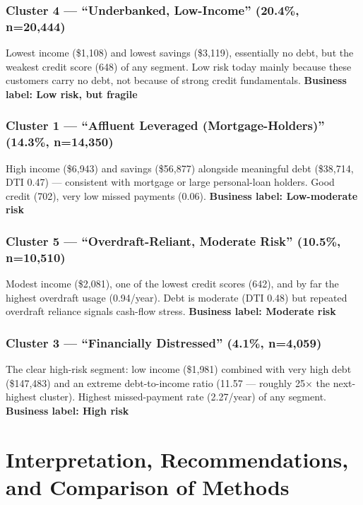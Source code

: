\documentclass[11pt]{article}
\begin{document}
\subsubsection*{Cluster 4 --- ``Underbanked, Low-Income'' (20.4\%, n=20,444)}
Lowest income (\$1{,}108) and lowest savings (\$3{,}119), essentially no debt, but the weakest credit score (648) of any segment. Low risk today mainly because these customers carry no debt, not because of strong credit fundamentals. \textbf{Business label: Low risk, but fragile}

\subsubsection*{Cluster 1 --- ``Affluent Leveraged (Mortgage-Holders)'' (14.3\%, n=14,350)}
High income (\$6{,}943) and savings (\$56{,}877) alongside meaningful debt (\$38{,}714, DTI 0.47) --- consistent with mortgage or large personal-loan holders. Good credit (702), very low missed payments (0.06). \textbf{Business label: Low-moderate risk}

\subsubsection*{Cluster 5 --- ``Overdraft-Reliant, Moderate Risk'' (10.5\%, n=10,510)}
Modest income (\$2{,}081), one of the lowest credit scores (642), and by far the highest overdraft usage (0.94/year). Debt is moderate (DTI 0.48) but repeated overdraft reliance signals cash-flow stress. \textbf{Business label: Moderate risk}

\subsubsection*{Cluster 3 --- ``Financially Distressed'' (4.1\%, n=4,059)}
The clear high-risk segment: low income (\$1{,}981) combined with very high debt (\$147{,}483) and an extreme debt-to-income ratio (11.57 --- roughly 25$\times$ the next-highest cluster). Highest missed-payment rate (2.27/year) of any segment. \textbf{Business label: High risk}

\section{Interpretation, Recommendations, and Comparison of Methods}
\end{document}
